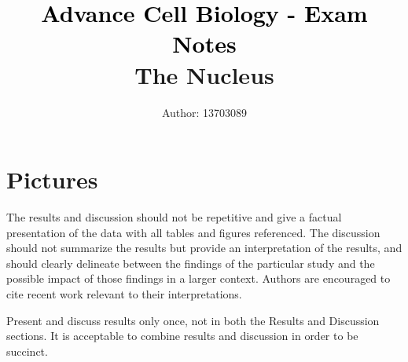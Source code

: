 \documentclass[10pt]{cls/labreport}
\title{\vspace*{2cm}\textcolor{black}{Advance Cell Biology - Exam Notes}\\
{\Large The Nucleus}}
\author[1]{Author: 13703089}
\affil[1]{BSc Biomedicine$^{\ast}$}
\begin{document}
\maketitle
\thispagestyle{firststyle}
\vspace{-13pt}%

%
\twocolstart
\section{Pictures}
The results and discussion should not be repetitive and give a factual presentation of the data with all tables and figures referenced. The discussion should not summarize the results but provide an interpretation of the results, and should clearly delineate between the findings of the particular study and the possible impact of those findings in a larger context. Authors are encouraged to cite recent work relevant to their interpretations.\\[1em]
\twocolend


Present and discuss results only once, not in both the Results and Discussion sections. It is acceptable to combine results and discussion in order  to be succinct.\\[4em]


\printbibliography
\end{document}
